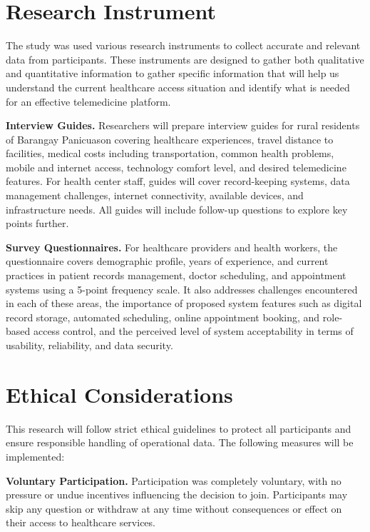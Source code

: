 \documentclass{research}
\begin{document}
\section{Research Instrument}

\indent The study was used various research instruments to collect accurate and relevant data from participants. These instruments are designed to gather both qualitative and quantitative information to gather specific information that will help us understand the current healthcare access situation and identify what is needed for an effective telemedicine platform.

\textbf{Interview Guides.} Researchers will prepare interview guides for rural residents 
of Barangay Panicuason covering healthcare experiences, travel distance to facilities, 
medical costs including transportation, common health problems, mobile and internet 
access, technology comfort level, and desired telemedicine features. For health center 
staff, guides will cover record-keeping systems, data management challenges, internet 
connectivity, available devices, and infrastructure needs. All guides will include 
follow-up questions to explore key points further.

\textbf{Survey Questionnaires.} For healthcare providers and health workers, the 
questionnaire covers demographic profile, years of experience, and current practices 
in patient records management, doctor scheduling, and appointment systems using a 
5-point frequency scale. It also addresses challenges encountered in each of these 
areas, the importance of proposed system features such as digital record storage, 
automated scheduling, online appointment booking, and role-based access control, and 
the perceived level of system acceptability in terms of usability, reliability, and 
data security.

\section{Ethical Considerations}

This research will follow strict ethical guidelines to protect all participants and 
ensure responsible handling of operational data. The following measures will be 
implemented:

\textbf{Voluntary Participation.} Participation was completely voluntary, with no 
pressure or undue incentives influencing the decision to join. Participants may skip 
any question or withdraw at any time without consequences or effect on their access 
to healthcare services.
\end{document}
